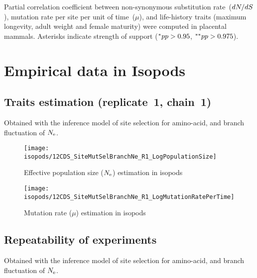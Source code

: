 \begin{table}[H]
    
    \caption[Partial correlation coefficient matrix in mammals ($\dnds$)]{
    Partial correlation coefficient between non-synonymous substitution rate~($\dnds$), mutation rate per site per unit of time~($\mu$), and life-history traits (maximum longevity, adult weight and female maturity) were computed in placental mammals.
    Asterisks indicate strength of support ($\smash{^{*}} pp > 0.95$, $\smash{^{**}} pp > 0.975$).}
\end{table}


\section{Empirical data in Isopods}
\label{sec:empirical-data-in-isopods}

\subsection{Traits estimation (replicate~1, chain~1)}
Obtained with the inference model of site selection for amino-acid, and branch fluctuation of $\Ne$.

\begin{figure}[H]
    \centering
    \texttt{[image: isopods/12CDS\_SiteMutSelBranchNe\_R1\_LogPopulationSize]}
    \caption[$\Ne$ estimation in isopods]{Effective population size ($\Ne$) estimation in isopods}
\end{figure}

\begin{figure}[H]
    \centering
    \texttt{[image: isopods/12CDS\_SiteMutSelBranchNe\_R1\_LogMutationRatePerTime]}
    \caption[Mutation rate estimation in isopods]{Mutation rate ($\mu$) estimation in isopods}
\end{figure}

\subsection{Repeatability of experiments}
Obtained with the inference model of site selection for amino-acid, and branch fluctuation of $\Ne$.

